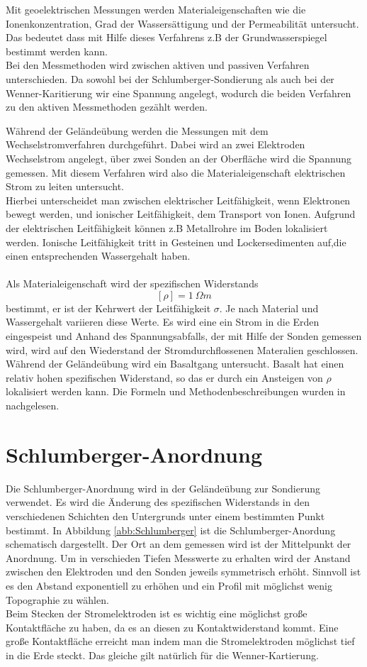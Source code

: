 
Mit geoelektrischen Messungen werden Materialeigenschaften wie die Ionenkonzentration, Grad der Wassersättigung und der Permeabilität untersucht. 
Das bedeutet dass mit Hilfe dieses Verfahrens z.B der Grundwasserspiegel bestimmt werden kann. \\
Bei den Messmethoden wird zwischen aktiven und passiven Verfahren unterschieden.  Da sowohl bei der Schlumberger-Sondierung als auch bei der Wenner-Karitierung wir eine Spannung angelegt, wodurch die beiden Verfahren zu den aktiven Messmethoden gezählt werden.



Während der Geländeübung werden die Messungen mit dem Wechselstromverfahren durchgeführt. Dabei wird an zwei Elektroden Wechselstrom angelegt,
über zwei Sonden an der Oberfläche wird die Spannung gemessen. Mit diesem Verfahren wird also die Materialeigenschaft elektrischen Strom zu leiten untersucht. \\
Hierbei unterscheidet man zwischen elektrischer Leitfähigkeit, wenn Elektronen bewegt werden, und ionischer Leitfähigkeit, dem Transport von Ionen. 
Aufgrund der elektrischen Leitfähigkeit können z.B Metallrohre im Boden lokalisiert werden. Ionische Leitfähigkeit tritt in Gesteinen und Lockersedimenten auf,die einen entsprechenden Wassergehalt haben. \\
\\
Als Materialeigenschaft wird der spezifischen Widerstands $$[\rho] = \SI{1}{\Omega m}$$ bestimmt, er ist der Kehrwert der Leitfähigkeit $\sigma$. Je nach Material und Wassergehalt variieren diese Werte. Es wird eine ein Strom in die Erden eingespeist und Anhand des Spannungsabfalls, der mit Hilfe der Sonden gemessen wird, wird auf den Wiederstand der Stromdurchflossenen Materalien geschlossen. Während der Geländeübung wird ein Basaltgang untersucht. Basalt hat einen relativ hohen spezifischen Widerstand, so das er durch ein Ansteigen  von $ \rho$ lokalisiert werden kann.
Die Formeln und Methodenbeschreibungen wurden in \cite{skript} nachgelesen.

\section{Schlumberger-Anordnung}
Die Schlumberger-Anordnung wird in der Geländeübung zur Sondierung verwendet. Es wird die Änderung des spezifischen Widerstands in den verschiedenen Schichten den Untergrunds unter einem bestimmten Punkt bestimmt. In Abbildung \ref{abb:Schlumberger} ist die Schlumberger-Anordung schematisch dargestellt. Der Ort an dem gemessen wird ist der Mittelpunkt der Anordnung. Um in verschieden Tiefen Messwerte zu erhalten wird der Anstand zwischen den Elektroden und den Sonden jeweils symmetrisch erhöht. Sinnvoll ist es den Abstand exponentiell zu erhöhen und ein Profil mit möglichst wenig Topographie zu wählen.\\
Beim Stecken der Stromelektroden ist es wichtig eine möglichst große Kontaktfläche zu haben, da es an diesen zu Kontaktwiderstand kommt. Eine große Kontaktfläche erreicht man indem man die Stromelektroden möglichst tief in die Erde steckt. 
Das gleiche gilt natürlich für die Wenner-Kartierung.


